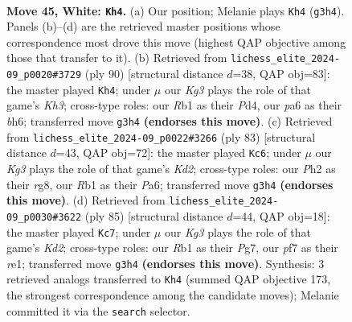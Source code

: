 \documentclass[11pt]{article}
\begin{document}
\clearpage

\begin{figure}[p]\centering
\begin{subfigure}{0.46\textwidth}\centering
\resizebox{\linewidth}{!}{%
\newchessgame
\chessboard[
  setfen={6r1/1p3p2/pR2pk2/8/P3P3/5PKP/7P/1R6 w - - 19 45},
  showmover=false,
  pgfstyle=straightmove, color=movearrow, markmove={g3-h4}
]}
\caption{}
\end{subfigure}\hfill
\begin{subfigure}{0.46\textwidth}\centering
\resizebox{\linewidth}{!}{%
\newchessgame
\chessboard[
  setfen={8/4kp2/4p2b/7P/3PRpP1/1r5K/6P1/8 w - - 1 46},
  showmover=false,
  pgfstyle=straightmove, color=movearrow, markmove={h3-h4}
]}
\caption{}
\end{subfigure}
\\[4pt]
\begin{subfigure}{0.46\textwidth}\centering
\resizebox{\linewidth}{!}{%
\newchessgame
\chessboard[
  setfen={6R1/2pk3R/p2pr3/8/2P2P2/r3PK1P/8/8 b - - 0 42},
  showmover=false,
  pgfstyle=straightmove, color=movearrow, markmove={d7-c6}
]}
\caption{}
\end{subfigure}\hfill
\begin{subfigure}{0.46\textwidth}\centering
\resizebox{\linewidth}{!}{%
\newchessgame
\chessboard[
  setfen={1R6/p2k1rp1/2p4p/r7/P1P1p2P/6P1/5P2/4RK2 b - - 1 43},
  showmover=false,
  pgfstyle=straightmove, color=movearrow, markmove={d7-c7}
]}
\caption{}
\end{subfigure}
\caption{\textbf{Move 45, White: \texttt{Kh4}.} (a) Our position; Melanie plays \texttt{Kh4} (\texttt{g3h4}). Panels (b)--(d) are the retrieved master positions whose correspondence most drove this move (highest QAP objective among those that transfer to it). (b) Retrieved from \texttt{lichess\_elite\_2024-09\_p0020\#3729} (ply 90) [structural distance $d$=38, QAP obj=83]: the master played \texttt{Kh4}; under $\mu$ our \emph{Kg3} plays the role of that game's \emph{Kh3}; cross-type roles: our \emph{R}b1 as their \emph{P}d4, our \emph{p}a6 as their \emph{b}h6; transferred move \texttt{g3h4} \textbf{(endorses this move)}. (c) Retrieved from \texttt{lichess\_elite\_2024-09\_p0022\#3266} (ply 83) [structural distance $d$=43, QAP obj=72]: the master played \texttt{Kc6}; under $\mu$ our \emph{Kg3} plays the role of that game's \emph{Kd2}; cross-type roles: our \emph{P}h2 as their \emph{r}g8, our \emph{R}b1 as their \emph{P}a6; transferred move \texttt{g3h4} \textbf{(endorses this move)}. (d) Retrieved from \texttt{lichess\_elite\_2024-09\_p0030\#3622} (ply 85) [structural distance $d$=44, QAP obj=18]: the master played \texttt{Kc7}; under $\mu$ our \emph{Kg3} plays the role of that game's \emph{Kd2}; cross-type roles: our \emph{R}b1 as their \emph{P}g7, our \emph{p}f7 as their \emph{r}e1; transferred move \texttt{g3h4} \textbf{(endorses this move)}. Synthesis: 3 retrieved analogs transferred to \texttt{Kh4} (summed QAP objective 173, the strongest correspondence among the candidate moves); Melanie committed it via the \texttt{search} selector.}
\label{fig:thought-m88}
\end{figure}
\end{document}
